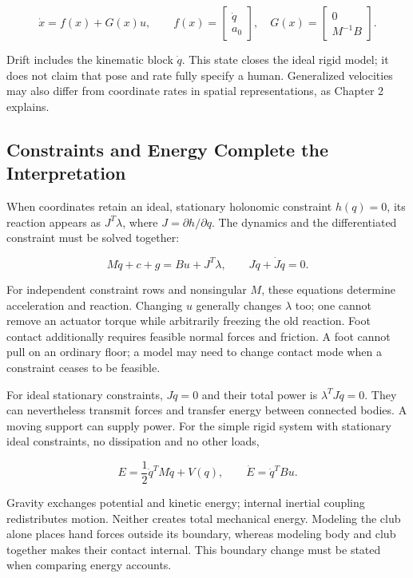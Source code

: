 \begin{equation}
\dot x=f(x)+G(x)u,\qquad
f(x)=\begin{bmatrix}\dot q\\a_0\end{bmatrix},\quad
G(x)=\begin{bmatrix}0\\M^{-1}B\end{bmatrix}.
\label{eq:ch01_affine}
\end{equation}

Drift includes the kinematic block \(\dot q\). This state closes the ideal rigid model; it does not claim that pose and rate fully specify a human. Generalized velocities may also differ from coordinate rates in spatial representations, as Chapter 2 explains.

\subsection{Constraints and Energy Complete the Interpretation}\label{ch01:constraints-and-energy-complete-the-interpretation}

When coordinates retain an ideal, stationary holonomic constraint \(h(q)=0\), its reaction appears as \(J^T\lambda\), where \(J=\partial h/\partial q\). The dynamics and the differentiated constraint must be solved together:

\[
M\ddot q+c+g=Bu+J^T\lambda,\qquad
J\ddot q+\dot J\dot q=0.
\]

For independent constraint rows and nonsingular \(M\), these equations determine acceleration and reaction. Changing \(u\) generally changes \(\lambda\) too; one cannot remove an actuator torque while arbitrarily freezing the old reaction. Foot contact additionally requires feasible normal forces and friction. A foot cannot pull on an ordinary floor; a model may need to change contact mode when a constraint ceases to be feasible.

For ideal stationary constraints, \(J\dot q=0\) and their total power is \(\lambda^TJ\dot q=0\). They can nevertheless transmit forces and transfer energy between connected bodies. A moving support can supply power. For the simple rigid system with stationary ideal constraints, no dissipation and no other loads,

\[
E=\frac12\dot q^TM\dot q+V(q),\qquad
\dot E=\dot q^TBu.
\]

Gravity exchanges potential and kinetic energy; internal inertial coupling redistributes motion. Neither creates total mechanical energy. Modeling the club alone places hand forces outside its boundary, whereas modeling body and club together makes their contact internal. This boundary change must be stated when comparing energy accounts.

